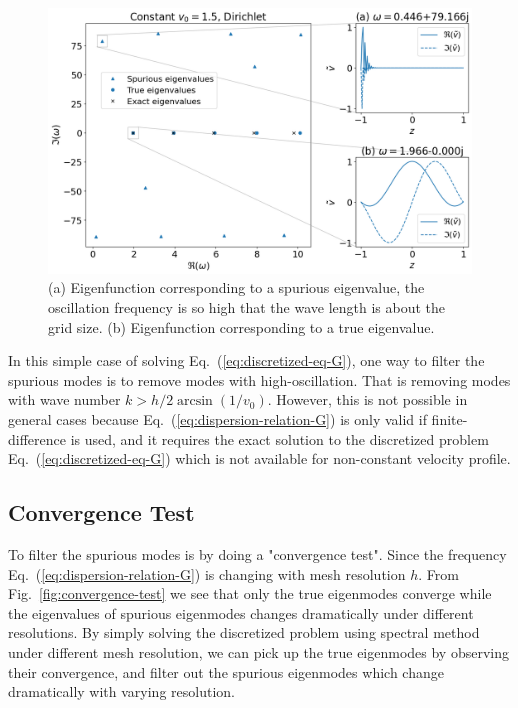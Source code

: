 \begin{figure}[htbp!]
	\centering
	\includegraphics[width=\textwidth]{figures/eigenmodes-FD.png}
	\caption{(a) Eigenfunction corresponding to a spurious eigenvalue, the oscillation frequency is so high that the wave length is about the grid size. (b) Eigenfunction corresponding to a true eigenvalue.}
	\label{fig:eigenmodes-FD}
\end{figure}

In this simple case of solving Eq.~(\ref{eq:discretized-eq-G}), one way to filter the spurious modes is to remove modes with high-oscillation. That is removing modes with wave number $k>h/2 \arcsin(1/v_0)$. However, this is not possible in general cases because Eq.~(\ref{eq:dispersion-relation-G}) is only valid if finite-difference is used, and it requires the exact solution to the discretized problem Eq.~(\ref{eq:discretized-eq-G}) which is not available for non-constant velocity profile.

\subsection{Convergence Test}
To filter the spurious modes is by doing a "convergence test". Since the frequency Eq.~(\ref{eq:dispersion-relation-G}) is changing with mesh resolution $h$. From Fig.~\ref{fig:convergence-test} we see that only the true eigenmodes converge while the eigenvalues of spurious eigenmodes changes dramatically under different resolutions. By simply solving the discretized problem using spectral method under different mesh resolution, we can pick up the true eigenmodes by observing their convergence, and filter out the spurious eigenmodes which change dramatically with varying resolution.

